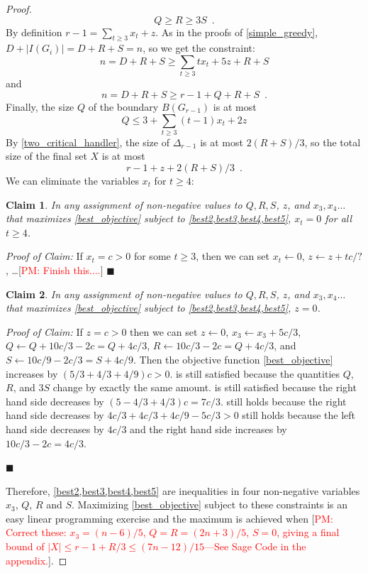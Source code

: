\documentclass[12pt]{article}
\newtheorem{clm}{Claim}
\newenvironment{clmproof}{\noindent\emph{Proof of Claim:}}{\hfill{$\blacksquare$}\par}
\theoremstyle{definition}
\newcommand{\pat}[1]{[\textcolor{red}{PM: #1}]}
\begin{document}
\begin{proof}
  \begin{equation}
    Q \ge R \ge 3S \enspace . \label{best2}
  \end{equation}
  By definition $r-1 = \sum_{t\ge 3}x_t+z$.
  As in the proofs of \cref{simple_greedy}, $D+|I(G_i)|=D+R+S=n$, so we get the constraint:
  \begin{equation}
    n = D+R+S \ge \sum_{t\ge 3} tx_t + 5z + R + S \label{best3}
  \end{equation}
  and
  \begin{equation}
    n = D+R+S \ge r-1 + Q + R + S \enspace . \label{best4}
  \end{equation}
  Finally, the size $Q$ of the boundary $B(G_{r-1})$ is at most
  \begin{equation}
    Q \le 3 + \sum_{t\ge 3}(t-1)x_t + 2z \label{best5}
  \end{equation}
  By \cref{two_critical_handler}, the size of $\Delta_{r-1}$ is at most $2(R+S)/3$, so the total size of the final set $X$ is at most
  \begin{equation}
    r-1 + z + 2(R + S)/3 \enspace .  \label{best_objective}
  \end{equation}
  We can eliminate the variables $x_t$ for $t\ge 4$:
  \begin{clm}
    In any assignment of non-negative values to $Q, R, S$, $z$, and $x_3,x_4\ldots$ that maximizes \cref{best_objective} subject to \cref{best2,best3,best4,best5}, $x_t=0$ for all $t\ge 4$.
  \end{clm}
  \begin{clmproof}
     If $x_t = c >0$ for some $t\ge 3$, then we can set $x_t\gets 0$, $z\gets z+tc/?$, \ldots \pat{Finish this....}
  \end{clmproof}
  \begin{clm}
    In any assignment of non-negative values to $Q, R, S$, $z$, and $x_3,x_4\ldots$ that maximizes \cref{best_objective} subject to \cref{best2,best3,best4,best5}, $z=0$.
  \end{clm}
  \begin{clmproof}
    If $z = c >0$  then we can set $z\gets 0$, $x_3\gets x_3+5c/3$, $Q\gets Q+10c/3-2c=Q+4c/3$, $R\gets 10c/3-2c=Q+4c/3$, and $S\gets 10c/9-2c/3=S+4c/9$. Then the objective function \cref{best_objective} increases by $(5/3+4/3+4/9)c >0$.   is still satisfied because the quantities $Q$, $R$, and $3S$ change by exactly the same amount.   is still satisfied because the right hand side decreases by $(5-4/3+4/3)c=7c/3$.  still holds because the right hand side decreases by $4c/3 + 4c/3 +4c/9 - 5c/3>0$   still holds because the left hand side decreases by $4c/3$ and the right hand side increases by $10c/3 - 2c=4c/3$.

  \end{clmproof}
  Therefore, \cref{best2,best3,best4,best5} are inequalities in four non-negative variables $x_3$, $Q$, $R$ and $S$.  Maximizing \cref{best_objective} subject to these constraints is an easy linear programming exercise and the maximum is achieved when \pat{Correct these: $x_3=(n-6)/5$, $Q=R=(2n+3)/5$, $S=0$, giving a final bound of $|X|\le r-1+R/3\le (7n-12)/15$---See Sage Code in the appendix.}.
\end{proof}
\end{document}
